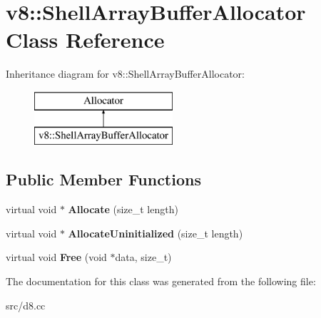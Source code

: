 \hypertarget{classv8_1_1_shell_array_buffer_allocator}{}\section{v8\+:\+:Shell\+Array\+Buffer\+Allocator Class Reference}
\label{classv8_1_1_shell_array_buffer_allocator}
Inheritance diagram for v8\+:\+:Shell\+Array\+Buffer\+Allocator\+:\begin{figure}[H]
\begin{center}
\leavevmode
\includegraphics[height=2.000000cm]{classv8_1_1_shell_array_buffer_allocator}
\end{center}
\end{figure}
\subsection*{Public Member Functions}
\begin{DoxyCompactItemize}
\item 
\hypertarget{classv8_1_1_shell_array_buffer_allocator_a838fd9909c41b26337cee9eee116478f}{}virtual void $\ast$ {\bfseries Allocate} (size\+\_\+t length)\label{classv8_1_1_shell_array_buffer_allocator_a838fd9909c41b26337cee9eee116478f}

\item 
\hypertarget{classv8_1_1_shell_array_buffer_allocator_a2657b47aa50b4648c2bca3dc095403d5}{}virtual void $\ast$ {\bfseries Allocate\+Uninitialized} (size\+\_\+t length)\label{classv8_1_1_shell_array_buffer_allocator_a2657b47aa50b4648c2bca3dc095403d5}

\item 
\hypertarget{classv8_1_1_shell_array_buffer_allocator_a45d39defdda349da64c5cec34371aa08}{}virtual void {\bfseries Free} (void $\ast$data, size\+\_\+t)\label{classv8_1_1_shell_array_buffer_allocator_a45d39defdda349da64c5cec34371aa08}

\end{DoxyCompactItemize}


The documentation for this class was generated from the following file\+:\begin{DoxyCompactItemize}
\item 
src/d8.\+cc\end{DoxyCompactItemize}

